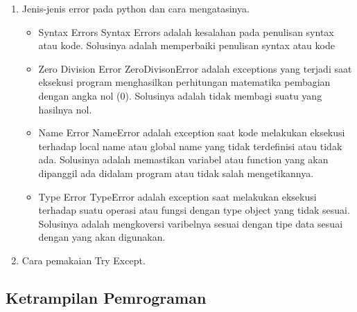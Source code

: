 \begin{enumerate}
\item Jenis-jenis error pada python dan cara mengatasinya.
\begin{itemize}
\item Syntax Errors
Syntax Errors adalah kesalahan pada penulisan syntax atau kode. Solusinya adalah memperbaiki penulisan syntax atau kode

\item Zero Division Error
ZeroDivisonError adalah exceptions yang terjadi saat eksekusi program menghasilkan perhitungan matematika pembagian dengan angka nol (0). Solusinya adalah tidak membagi suatu yang hasilnya nol.

\item Name Error
NameError adalah exception saat kode melakukan eksekusi terhadap local name atau global name yang tidak terdefinisi atau tidak ada. Solusinya adalah memastikan variabel atau function yang akan dipanggil ada didalam program atau tidak salah mengetikannya.

\item Type Error
TypeError adalah exception saat melakukan eksekusi terhadap suatu operasi atau fungsi dengan type object yang tidak sesuai. Solusinya adalah mengkoversi varibelnya sesuai dengan tipe data sesuai dengan yang akan digunakan.

\end{itemize}

\item Cara pemakaian Try Except.


\end{enumerate}
\hfill \break

\subsection{Ketrampilan Pemrograman}

